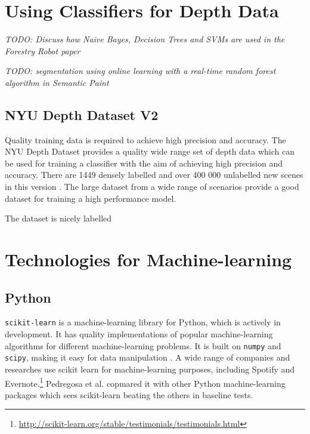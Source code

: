 \documentclass[lit_review.tex]{subfiles}
\begin{document}
\section{Using Classifiers for Depth Data}
\textit{TODO: Discuss how Naive Bayes, Decision Trees and SVMs are used in the Forestry Robot paper \cite{forestry}}

\textit{TODO: segmentation using online learning with a real-time random forest algorithm in Semantic Paint \cite{semantic-paint}}

\subsection{NYU Depth Dataset V2}
Quality training data is required to achieve high precision and accuracy. The NYU Depth Dataset provides a quality wide range set of depth data which can be used for training a classifier with the aim of achieving high precision and accuracy. There are 1449 densely labelled and over 400 000 unlabelled new scenes in this version \cite{nyu-dataset}. The large dataset from a wide range of scenarios provide a good dataset for training a high performance model.

The dataset is nicely labelled


\newpage

\section{Technologies for Machine-learning}
\subsection{Python}
\texttt{scikit-learn} is a machine-learning library for Python, which is actively in development. It has quality implementations of popular machine-learning algorithms for different machine-learning problems. It is built on \texttt{numpy} and \texttt{scipy}, making it easy for data manipulation \cite{scikit-learn-paper}. A wide range of companies and researches use scikit learn for machine-learning purposes, including Spotify and Evernote.\footnote{\url{http://scikit-learn.org/stable/testimonials/testimonials.html}} Pedregosa et al. \cite{scikit-learn-paper} copmared it with other Python machine-learning packages which sees scikit-learn beating the others in baseline tests.
\end{document}
